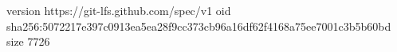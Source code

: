 version https://git-lfs.github.com/spec/v1
oid sha256:5072217e397c0913ea5ea28f9cc373cb96a16df62f4168a75ee7001c3b5b60bd
size 7726
